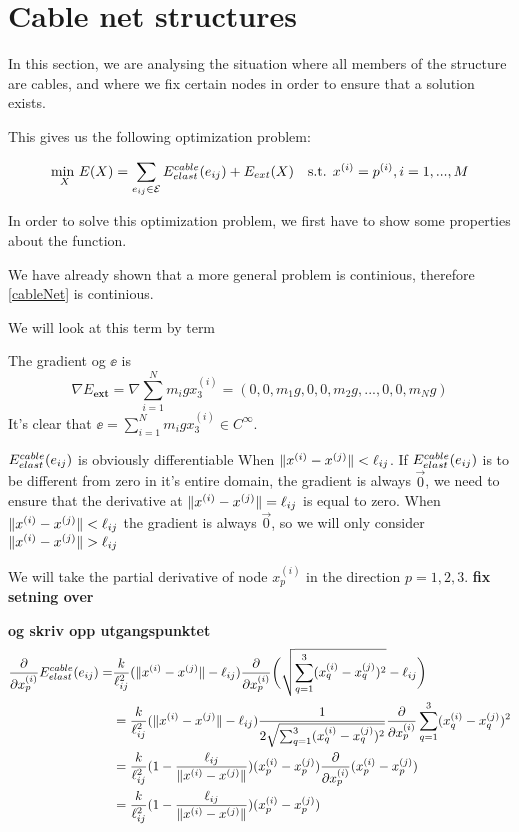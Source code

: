 \section{Cable net structures}
In this section, we are analysing the situation where all members of the structure are cables, and where we fix certain nodes in order to ensure that a solution exists.

This gives us the following optimization problem:

\begin{equation}
    \underset{X}{\text{min }} E(X) = \sum\limits_{e_{ij} \in \mathcal{E}} E^{cable}_{elast}(e_{ij}) + E_{ext}(X) \quad \text{s.t. } x^{(i)} = p^{(i)}, i = 1,...,M
    \label{cableNet}
\end{equation}

In order to solve this optimization problem, we first have to show some properties about the function.

We have already shown that a more general problem is continious, therefore \eqref{cableNet} is continious.

We will look at this term by term

The gradient og $\ee$ is 
\begin{equation}
    \nabla E_{\textbf{ext}} = \nabla \sum_{i=1}^N m_i g x_3^{(i)}
    = (0,0,m_1 g, 0,0,m_2 g,...,0,0,m_N g)
    \label{gradient_external_force}
\end{equation}
It's clear that $\ee = \sum_{i=1}^N m_i g x_3^{(i)} \in C^{\infty}$. 

$E^{cable}_{elast}(e_{ij})$ is obviously differentiable When $\lVert x^{(i)} - x^{(j)}\rVert < \ell_{ij}$. If $E^{cable}_{elast}(e_{ij})$ is to be different from zero in it's entire domain, the gradient is always $\Vec{0}$,  we need to ensure that the derivative at $\lVert x^{(i)} - x^{(j)}\rVert = \ell_{ij}$ is equal to zero. When $\lVert x^{(i)} - x^{(j)}\rVert < \ell_{ij}$ the gradient is always $\Vec{0}$, so we will only consider $\lVert x^{(i)} - x^{(j)}\rVert>\ell_{ij}$

We will take the partial derivative of node $x_p^{(i)}$ in the direction $p=1,2,3$. \textbf{fix setning over}

\textbf{og skriv opp utgangspunktet}
\begin{align}
    \frac{\partial}{\partial x_p^{(i)}} E^{cable}_{elast}(e_{ij}) =  &\frac{k}{\ell_{ij}^2}(\lVert x^{(i)} - x^{(j)}\rVert - \ell_{ij}) \frac{\partial}{\partial x_p^{(i)}} \bigg(\sqrt{ \sum_{q=1}^3 (x_q^{(i)}-x_q^{(j)})^2}-\ell_{ij}\bigg)\\&=\frac{k}{\ell_{ij}^2} (\lVert x^{(i)} - x^{(j)}\rVert - \ell_{ij}) \frac{1}{2\sqrt{\sum_{q=1}^3 (x_q^{(i)}-x_q^{(j)})^2}}\frac{\partial}{\partial x_p^{(i)}} \sum_{q=1}^3(x_q^{(i)}-x_q^{(j)})^2\\ &= \frac{k}{\ell_{ij}^2} (1 - \frac{\ell_{ij}}{\lVert x^{(i)} - x^{(j)}\rVert}) (x_p^{(i)} - x_p^{(j)}) \frac{\partial}{\partial x_p^{(i)}} (x_p^{(i)} - x_p^{(j)})\\ &= \frac{k}{\ell_{ij}^2} (1- \frac{\ell_{ij}}{\lVert x^{(i)} - x^{(j)}\rVert}) (x_p^{(i)} - x_p^{(j)})
\end{align}

